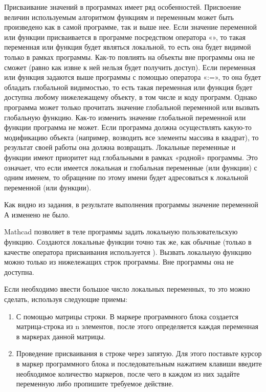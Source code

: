 Присваивание значений в программах имеет ряд особенностей. Присвоение величин используемым алгоритмом функциям и переменным может быть произведено как в самой программе, так и выше нее. Если значение переменной или функции присваивается в программе посредством оператора «», то такая переменная или функция будет являться локальной, то есть она будет видимой только в рамках программы. Как-то повлиять на объекты вне программы она не сможет (равно как извне к ней нельзя будет получить доступ). Если переменная или функция задаются выше программы с помощью оператора «:=», то она будет обладать глобальной видимостью, то есть такая переменная или функция будет доступна любому нижележащему объекту, в том числе и коду программ. Однако программа может только прочитать значение глобальной переменной или вызвать глобальную функцию. Как-то изменить значение глобальной переменной или функции программа не может. Если программа должна осуществлять какую-то модификацию объекта (например, возводить все элементы массива в квадрат), то результат своей работы она должна возвращать.
Локальные переменные и функции имеют приоритет над глобальными в рамках «родной» программы. Это означает, что если имеется локальная и глобальная переменные (или функции) с одним именем, то обращение по этому имени будет адресоваться к локальной переменной (или функции).



Как видно из задания, в результате выполнения программы значение переменной А изменено не было.

Mathcad позволяет в теле программы задать локальную пользовательскую функцию. Создаются локальные функции точно так же, как обычные (только в качестве оператора присваивания используется ). Вызвать локальную функцию можно только из нижележащих строк программы. Вне программы она не доступна.


Если необходимо ввести большое число локальных переменных, то это можно сделать, используя следующие приемы:
\begin{enumerate}
	\item С помощью матрицы строки. В маркере программного блока создается матрица-строка из n элементов, после этого определяется каждая переменная в маркерах данной матрицы.
	\item Проведение присваивания в строке через запятую. Для этого поставьте курсор в маркер программного блока и последовательным нажатием клавиши \keys{,} введите необходимое количество маркеров, после чего в каждом из них задайте переменную либо пропишите требуемое действие.
\end{enumerate}

